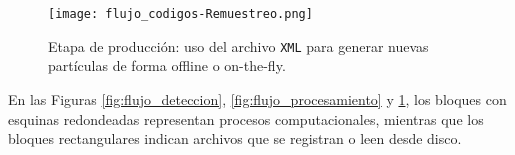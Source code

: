 \begin{figure}[H]
    \centering
    \texttt{[image: flujo\_codigos-Remuestreo.png]}
    \caption{Etapa de producción: uso del archivo \texttt{XML} para generar nuevas partículas de forma offline o on-the-fly.}
    \label{fig:flujo_produccion}
\end{figure}

En las Figuras \ref{fig:flujo_deteccion}, \ref{fig:flujo_procesamiento} y \ref{fig:flujo_produccion}, los bloques con esquinas redondeadas representan procesos computacionales, mientras que los bloques rectangulares indican archivos que se registran o leen desde disco.


